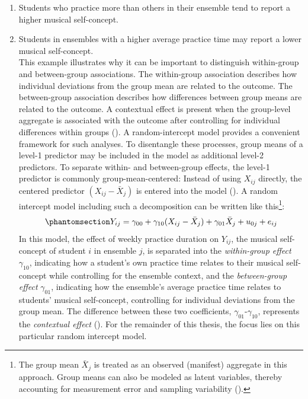 \documentclass[
  letterpaper,
  11pt,
  english,
  singlespacing,
  headsepline,
  openany]{MastersDoctoralThesis}
\providecommand{\tightlist}{%
  \setlength{\itemsep}{0pt}\setlength{\parskip}{0pt}}
\begin{document}
\begin{enumerate}
\def\labelenumi{\arabic{enumi}.}
\tightlist
\item
  Students who practice more than others in their ensemble tend to
  report a higher musical self-concept.
\item
  Students in ensembles with a higher average practice time may report a
  lower musical self-concept.\\
  This example illustrates why it can be important to distinguish
  within-group and between-group associations. The within-group
  association describes how individual deviations from the group mean
  are related to the outcome. The between-group association describes
  how differences between group means are related to the outcome. A
  contextual effect is present when the group-level aggregate is
  associated with the outcome after controlling for individual
  differences within groups (). A random-intercept model provides a convenient
  framework for such analyses. To disentangle these processes, group
  means of a level-1 predictor may be included in the model as
  additional level-2 predictors. To separate within- and between-group
  effects, the level-1 predictor is commonly group-mean-centered:
  Instead of using \(X_{ij}\) directly, the centered predictor
  \((X_{ij} - \bar{X}_j)\) is entered into the model
  (). A random
  intercept model including such a decomposition can be written like
  this\footnote{The group mean \(\bar{X}_{j}\) is treated as an observed
    (manifest) aggregate in this approach. Group means can also be
    modeled as latent variables, thereby accounting for measurement
    error and sampling variability ().}: \begin{equation}\phantomsection\label{eq-RI}{ 
  Y_{ij} = \gamma_{00} + \gamma_{10}(X_{ij} - \bar{X}_{j}) + \gamma_{01}\bar{X}_{j} + u_{0j} + e_{ij}
  }\end{equation} In this model, the effect of weekly practice duration
  on \(Y_{ij}\), the musical self-concept of student \(i\) in ensemble
  \(j\), is separated into the \emph{within-group effect}
  \(\gamma_{10}\), indicating how a student's own practice time relates
  to their musical self-concept while controlling for the ensemble
  context, and the \emph{between-group effect} \(\gamma_{01}\),
  indicating how the ensemble's average practice time relates to
  students' musical self-concept, controlling for individual deviations
  from the group mean. The difference between these two coefficients,
  \(\gamma_{01}\)-\(\gamma_{10}\), represents the \emph{contextual
  effect} ().
  For the remainder of this thesis, the focus lies on this particular
  random intercept model.
\end{enumerate}
\end{document}
